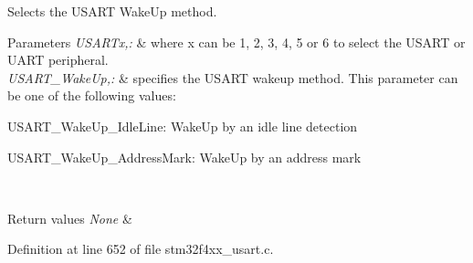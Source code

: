 Selects the U\-S\-A\-R\-T Wake\-Up method. 


\begin{DoxyParams}{Parameters}
{\em U\-S\-A\-R\-Tx,\-:} & where x can be 1, 2, 3, 4, 5 or 6 to select the U\-S\-A\-R\-T or U\-A\-R\-T peripheral. \\
\hline
{\em U\-S\-A\-R\-T\-\_\-\-Wake\-Up,\-:} & specifies the U\-S\-A\-R\-T wakeup method. This parameter can be one of the following values\-: \begin{DoxyItemize}
\item U\-S\-A\-R\-T\-\_\-\-Wake\-Up\-\_\-\-Idle\-Line\-: Wake\-Up by an idle line detection \item U\-S\-A\-R\-T\-\_\-\-Wake\-Up\-\_\-\-Address\-Mark\-: Wake\-Up by an address mark \end{DoxyItemize}
\\
\hline
\end{DoxyParams}

\begin{DoxyRetVals}{Return values}
{\em None} & \\
\hline
\end{DoxyRetVals}


Definition at line 652 of file stm32f4xx\-\_\-usart.\-c.

